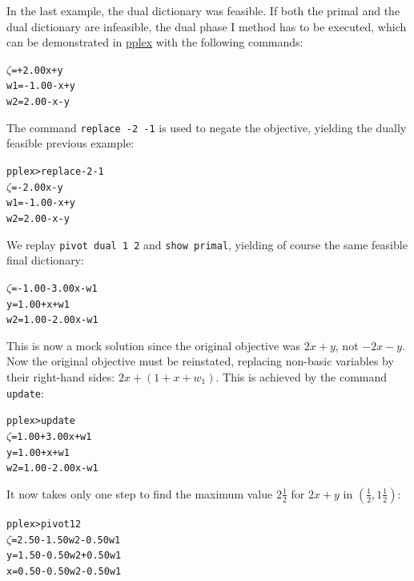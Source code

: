 \documentclass[ukenglish]{nik}
\begin{document}
In the last example, the dual dictionary was feasible. If both the primal and
the dual dictionary are infeasible, the dual phase I method has to be executed, 
which can be demonstrated in \url{pplex} with the following commands:
%
\begin{alltt}
 \(\zeta\) =        + 2.00x + y
w1 = - 1.00 -     x + y
w2 =   2.00 -     x - y
\end{alltt}
The command \verb|replace -2 -1| is used to negate the objective,
yielding the dually feasible previous example:
\begin{alltt}
pplex> replace -2 -1
 \(\zeta\)  =        - 2.00x - y
w1 = - 1.00 -     x + y
w2 =   2.00 -     x - y
\end{alltt}
We replay \verb|pivot dual 1 2| and \verb|show primal|,
yielding of course the same feasible final dictionary:
\begin{alltt}
 \(\zeta\) = - 1.00 - 3.00x - w1
 y =   1.00 +     x + w1
w2 =   1.00 - 2.00x - w1
\end{alltt}
This is now a mock solution since the original objective was $2x+y$,
not $-2x-y$. Now the original objective must be reinstated,
replacing non-basic variables by their right-hand sides: $2x+(1+x+w_1)$.
This is achieved by the command \verb|update|:
\begin{alltt}
pplex> update
 \(\zeta\) = 1.00 + 3.00x + w1
 y = 1.00 +     x + w1
w2 = 1.00 - 2.00x - w1
\end{alltt}
It now takes only one step to find the maximum value $2\frac{1}{2}$ 
for $2x+y$ in $(\frac{1}{2},1\frac{1}{2})$:
\begin{alltt}
pplex> pivot 1 2
 \(\zeta\) = 2.50 - 1.50w2 - 0.50w1
 y = 1.50 - 0.50w2 + 0.50w1
 x = 0.50 - 0.50w2 - 0.50w1
\end{alltt}
\end{document}
